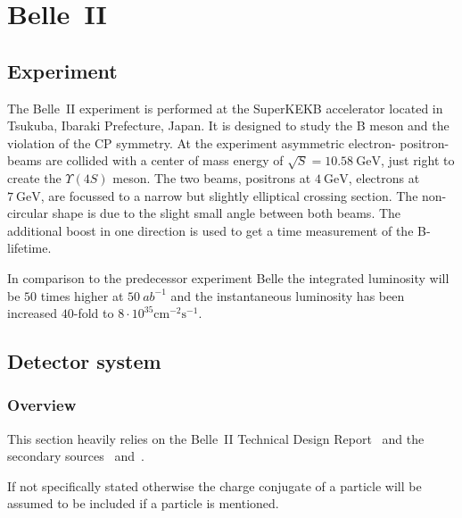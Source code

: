 \chapter{Belle~\RN{2}}
\label{chap:belle2_experiment}

\section{Experiment}
\label{sec:experimental}

The Belle~\RN{2} experiment is performed at the SuperKEKB accelerator located in Tsukuba, Ibaraki Prefecture, Japan. It is designed to study the B meson and the violation of the CP symmetry.
At the experiment asymmetric electron- positron-beams are collided with a center of mass energy of $\sqrt{S} = 10.58 \mathrm{~GeV}$, just right to create the $\Upsilon (4S)$ meson. The two beams, positrons at $4 \mathrm{~GeV}$, electrons at $7 \mathrm{~GeV}$, are focussed to a narrow but slightly elliptical crossing section. The non-circular shape is due to the slight small angle between both beams. The additional boost in one direction is used to get a time measurement of the B-lifetime.

In comparison to the predecessor experiment Belle the integrated luminosity will be $50$ times higher at $50~{ab}^{-1}$ and the instantaneous luminosity has been increased $40$-fold to $8 \cdot 10^{35} \mathrm{cm}^{-2} \mathrm{s}^{-1}$.

\section{Detector system}
\label{sec:detector_system}

\subsection{Overview}
\label{subsec:detector_system_overview}

This section heavily relies on the Belle~\RN{2} Technical Design Report~\cite{Abe:2010gxa} and the secondary sources~\cite{Pulvermacher:SuperKEKBDetectorComponents} and~\cite{Pulvermacher:AnalysisSoftware}.

If not specifically stated otherwise the charge conjugate of a particle will be assumed to be included if a particle is mentioned.


